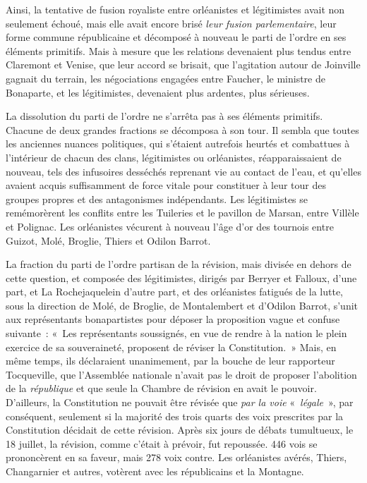\documentclass[french,twoside]{book} %
\begin{document}
Ainsi, la tentative de fusion royaliste entre orléanistes et légitimistes avait non seulement échoué, mais elle avait encore brisé \emph{leur fusion parlementaire}, leur forme commune républicaine et décomposé à nouveau le parti de l’ordre en ses éléments primitifs. Mais à mesure que les relations devenaient plus tendus entre Claremont et Venise, que leur accord se brisait, que l’agitation autour de Joinville gagnait du terrain, les négociations engagées entre Faucher, le ministre de Bonaparte, et les légitimistes, devenaient plus ardentes, plus sérieuses.\par
La dissolution du parti de l’ordre ne s’arrêta pas à ses éléments primitifs. Chacune de deux grandes fractions se décomposa à son tour. Il sembla que toutes les anciennes nuances politiques, qui s’étaient autrefois heurtés et combattues à l’intérieur de chacun des clans, légitimistes ou orléanistes, réapparaissaient de nouveau, tels des infusoires desséchés reprenant vie au contact de l’eau, et qu’elles avaient acquis suffisamment de force vitale pour constituer à leur tour des groupes propres et des antagonismes indépendants. Les légitimistes se remémorèrent les conflits entre les Tuileries et le pavillon de Marsan, entre Villèle et Polignac. Les orléanistes vécurent à nouveau l’âge d’or des tournois entre Guizot, Molé, Broglie, Thiers et Odilon Barrot.\par
La fraction du parti de l’ordre partisan de la révision, mais divisée en dehors de cette question, et composée des légitimistes, dirigés par Berryer et Falloux, d’une part, et La Rochejaquelein d’autre part, et des orléanistes fatigués de la lutte, sous la direction de Molé, de Broglie, de Montalembert et d’Odilon Barrot, s’unit aux représentants bonapartistes pour déposer la proposition vague et confuse suivante : « Les représentants soussignés, en vue de rendre à la nation le plein exercice de sa souveraineté, proposent de réviser la Constitution. » Mais, en même temps, ils déclaraient unanimement, par la bouche de leur rapporteur Tocqueville, que l’Assemblée nationale n’avait pas le droit de proposer l’abolition de la \emph{république} et que seule la Chambre de révision en avait le pouvoir. D’ailleurs, la Constitution ne pouvait être révisée que \emph{par la voie} « \emph{légale} », par conséquent, seulement si la majorité des trois quarts des voix prescrites par la Constitution décidait de cette révision. Après six jours de débats tumultueux, le 18 juillet, la révision, comme c’était à prévoir, fut repoussée. 446 vois se prononcèrent en sa faveur, mais 278 voix contre. Les orléanistes avérés, Thiers, Changarnier et autres, votèrent avec les républicains et la Montagne.\par
\end{document}
